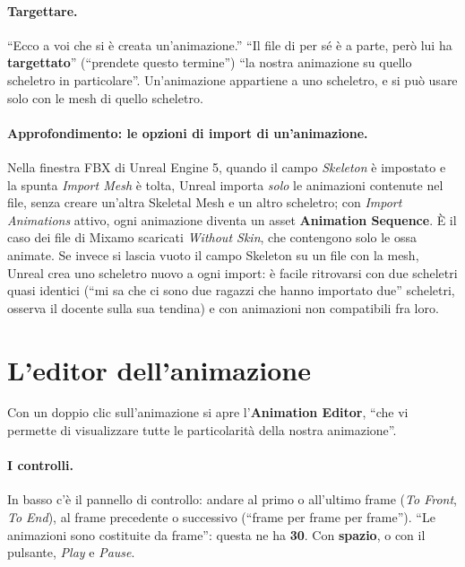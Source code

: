 \paragraph{Targettare.} ``Ecco a voi che si è creata un'animazione.'' ``Il file di per sé
è a parte, però lui ha \textbf{targettato}'' (``prendete questo termine'') ``la nostra
animazione su quello scheletro in particolare''. Un'animazione appartiene a uno
scheletro, e si può usare solo con le mesh di quello scheletro.

\paragraph{Approfondimento: le opzioni di import di un'animazione.} Nella finestra FBX
di Unreal Engine 5, quando il campo \emph{Skeleton} è impostato e la spunta
\emph{Import Mesh} è tolta, Unreal importa \emph{solo} le animazioni contenute nel file,
senza creare un'altra Skeletal Mesh e un altro scheletro; con \emph{Import Animations}
attivo, ogni animazione diventa un asset \textbf{Animation Sequence}. È il caso dei file
di Mixamo scaricati \emph{Without Skin}, che contengono solo le ossa animate. Se invece
si lascia vuoto il campo Skeleton su un file con la mesh, Unreal crea uno scheletro nuovo
a ogni import: è facile ritrovarsi con due scheletri quasi identici (``mi sa che ci sono
due ragazzi che hanno importato due'' scheletri, osserva il docente sulla sua tendina) e
con animazioni non compatibili fra loro.

\section{L'editor dell'animazione}
\label{ue8:sec:animeditor}

Con un doppio clic sull'animazione si apre l'\textbf{Animation Editor}, ``che vi permette
di visualizzare tutte le particolarità della nostra animazione''.

\paragraph{I controlli.} In basso c'è il pannello di controllo: andare al primo o
all'ultimo frame (\emph{To Front}, \emph{To End}), al frame precedente o successivo
(``frame per frame per frame''). ``Le animazioni sono costituite da frame'': questa ne ha
\textbf{30}. Con \textbf{spazio}, o con il pulsante, \emph{Play} e \emph{Pause}.


